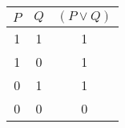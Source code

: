 \begin{tabular}{|c|c||c|}
\hline
$ P $ & $ Q $ & $ (P \vee Q) $ \\
\hline
1 & 1 & 1 \\
1 & 0 & 1 \\
0 & 1 & 1 \\
0 & 0 & 0 \\
\hline
\end{tabular}
